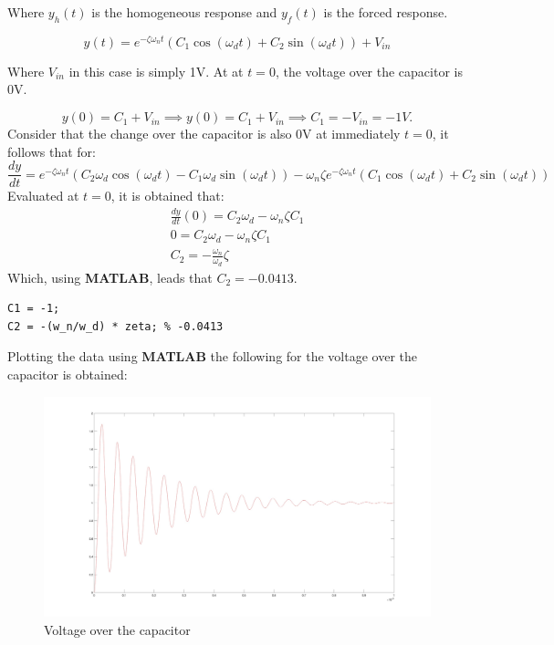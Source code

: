 Where $y_h(t)$ is the homogeneous response and $y_f(t)$ is the forced response.

\begin{equation}
    y(t) = e^{-\zeta \omega_n t}\left(C_1\cos(\omega_d t) + C_2\sin(\omega_d t)\right) + V_{in}
\end{equation}

Where $V_{in}$ in this case is simply 1V. At at $t=0$, the voltage over the capacitor is 0V.

\begin{equation}
    y(0) = C_1 + V_{in} \implies y(0) = C_1 + V_{in} \implies C_1 = -V_{in} = -1V.
\end{equation}
Consider that the change over the capacitor is also 0V at immediately $t=0$,
it follows that for:
\begin{equation}
    \frac{dy}{dt} = e^{-\zeta \omega_n t} \left(C_2 \omega_d \cos(\omega_d t) - C_1 \omega_d \sin(\omega_d t)\right) - \omega_n \zeta e^{-\zeta \omega_n t} \left(C_1\cos(\omega_d t) + C_2\sin(\omega_d t)\right)
\end{equation}
Evaluated at $t=0$, it is obtained that:
\begin{equation}
    \begin{gathered}
        \frac{dy}{dt}(0) = C_2 \omega_d - \omega_n \zeta C_1 \\
        0 = C_2 \omega_d - \omega_n \zeta C_1 \\
        C_2 = - \frac{\omega_n}{\omega_d} \zeta
    \end{gathered}
\end{equation}
Which, using {\bf MATLAB}, leads that $C_2 = -0.0413$.
\begin{verbatim}
C1 = -1;
C2 = -(w_n/w_d) * zeta; % -0.0413    
\end{verbatim}

Plotting the data using {\bf MATLAB} the following for the voltage over the capacitor is obtained:

\begin{figure}[H]
    \centering
    \includegraphics[width=\linewidth]{images/evaluation_vc.jpg}
    \caption{Voltage over the capacitor}
    \label{fig:evaluation_vc}
\end{figure}

